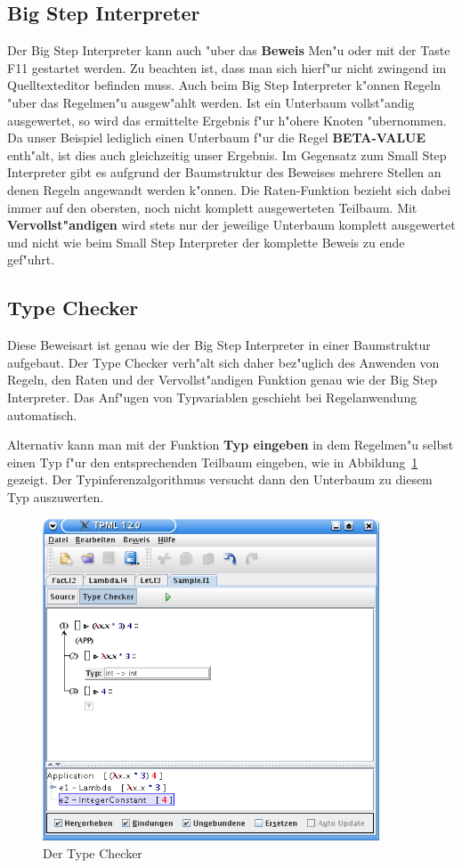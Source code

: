 \subsection{Big Step Interpreter}
Der Big Step Interpreter kann auch "uber das {\bf Beweis} Men"u oder
mit der Taste F11 gestartet werden. Zu beachten ist, dass man sich
hierf"ur nicht zwingend im Quelltexteditor befinden muss. Auch beim
Big Step Interpreter k"onnen Regeln "uber das Regelmen"u ausgew"ahlt
werden. Ist ein Unterbaum vollst"andig ausgewertet, so wird das
ermittelte Ergebnis f"ur h"ohere Knoten "ubernommen. Da unser
Beispiel lediglich einen Unterbaum f"ur die Regel {\bf BETA-VALUE}
enth"alt, ist dies auch gleichzeitig unser Ergebnis. Im Gegensatz
zum Small Step Interpreter gibt es aufgrund der Baumstruktur des
Beweises mehrere Stellen an denen Regeln angewandt werden k"onnen.
Die Raten-Funktion bezieht sich dabei immer auf den obersten, noch
nicht komplett ausgewerteten Teilbaum. Mit {\bf Vervollst"andigen}
wird stets nur der jeweilige Unterbaum komplett ausgewertet und
nicht wie beim Small Step Interpreter der komplette Beweis zu ende
gef"uhrt.

\subsection{Type Checker}

Diese Beweisart ist genau wie der Big Step Interpreter in einer
Baumstruktur aufgebaut. Der Type Checker verh"alt sich daher
bez"uglich des Anwenden von Regeln, den Raten und der
Vervollst"andigen Funktion genau wie der Big Step Interpreter. Das
Anf"ugen von Typvariablen geschieht bei Regelanwendung automatisch.

Alternativ kann man mit der Funktion {\bf Typ eingeben} in dem
Regelmen"u selbst einen Typ f"ur den entsprechenden Teilbaum
eingeben, wie in Abbildung~\ref{FigureTypeChecker} gezeigt.
Der Typinferenzalgorithmus versucht dann den Unterbaum zu
diesem Typ auszuwerten.

\begin{figure}[h]
\begin{center}
\includegraphics[width=10cm]{images/type-checker.png}
\caption{Der Type Checker}
\label{FigureTypeChecker}
\end{center}
\end{figure}

